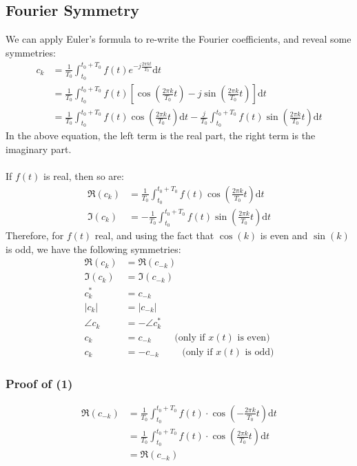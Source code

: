 \documentclass[10pt]{article}
\begin{document}
\subsection*{Fourier Symmetry}
We can apply Euler's formula to re-write the Fourier coefficients, and reveal some symmetries:
\begin{align*}
    c_k &= \frac{1}{T_0} \int_{t_0}^{t_0 + T_0} f(t) e^{-j\frac{2\pi kt}{T_0}}\text{d}t\\
    &= \frac{1}{T_0} \int_{t_0}^{t_0 + T_0} f(t) \left[\cos\left(\frac{2\pi k}{T_0}t\right) - j \sin\left(\frac{2\pi k}{T_0}t\right)\right]\text{d}t\\    &= \frac{1}{T_0} \int_{t_0}^{t_0 + T_0} f(t) \cos\left(\frac{2\pi k}{T_0}t\right) \text{d}t - \frac{j}{T_0} \int_{t_0}^{t_0 + T_0} f(t) \sin\left(\frac{2\pi k}{T_0}t\right)\text{d}t
\end{align*}
In the above equation, the left term is the real part, the right term is the imaginary part.\\\\
If $f(t)$ is real, then so are:
\begin{align*}
    \mathfrak{R}(c_k) &= \frac{1}{T_0}\int_{t_0}^{t_0 + T_0}f(t)\cos\left(\frac{2\pi k}{T_0}t\right)\text{d}t\\
    \mathfrak{I}(c_k) &= -\frac{1}{T_0}\int_{t_0}^{t_0 + T_0}f(t)\sin\left(\frac{2\pi k}{T_0}t\right)\text{d}t
\end{align*}
Therefore, for $f(t)$ real, and using the fact that $\cos(k)$ is even and $\sin(k)$ is odd, we have the following symmetries:
\begin{align}
    \mathfrak{R}(c_k) &= \mathfrak{R}(c_{-k})\\
    \mathfrak{I}(c_k) &= \mathfrak{I}(c_{-k})\\
    c_k^* &= c_{-k}\\
    |c_k| &= |c_{-k}|\\
    \angle c_k &= -\angle c_k^*\\
    c_k &= c_{-k}\hspace{1cm} \text{(only if $x(t)$ is even)}\\
    c_k &= -c_{-k}\hspace{1cm} \text{(only if $x(t)$ is odd)}
\end{align}
\subsubsection*{Proof of (1)}
\begin{align*}
    \mathfrak{R}(c_{-k}) &= \frac{1}{T_0} \int_{t_0}^{t_0 + T_0}f(t) \cdot \cos\left(-\frac{2\pi k}{T_0} t\right) \text{d}t\\
    &= \frac{1}{T_0} \int_{t_0}^{t_0 + T_0}f(t) \cdot \cos\left(\frac{2\pi k}{T_0} t\right) \text{d}t\\
    &= \mathfrak{R}(c_{-k})
\end{align*}
\end{document}
